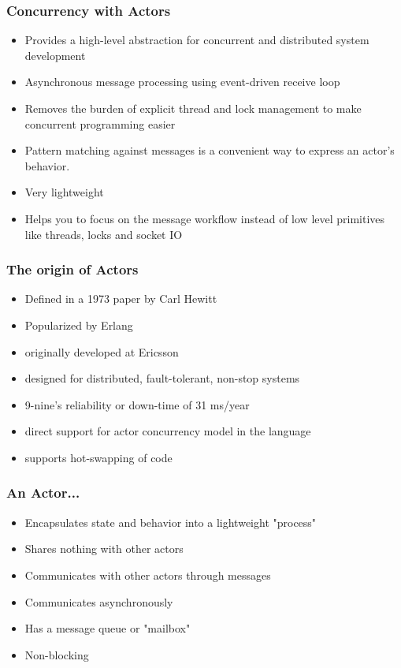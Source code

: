 \documentclass{beamer}
\begin{document}
\frame
    {
      \frametitle{Concurrency with Actors}
      \begin{itemize}
      \item Provides a high-level abstraction for concurrent and distributed
        system development
      \item  Asynchronous message processing using event-driven
        receive loop
      \item Removes the burden of explicit thread and lock management to
        make concurrent programming easier
      \item Pattern matching
        against messages is a convenient way to express an actor's
        behavior.
      \item Very lightweight
      \item Helps you to focus on the message workflow instead of
        low level primitives like threads, locks and socket IO
      \end{itemize}
    }



\frame
    {
      \frametitle{The origin of Actors}
      \begin{itemize}
      \item Defined in a 1973 paper by Carl Hewitt

      \item Popularized by Erlang

      \item originally developed at Ericsson
      \item  designed for distributed, fault-tolerant, non-stop systems
      \item 9-nine's reliability or down-time of 31 ms/year
      \item direct support for actor concurrency model in the language
      \item supports hot-swapping of code
      \end{itemize}
    }




\frame
{
  \frametitle{An Actor...}

  \begin{itemize}
  \item Encapsulates state and behavior into a lightweight "process"
  \item Shares nothing with other actors
  \item Communicates with other actors through messages 
  \item Communicates asynchronously
  \item Has a message queue or "mailbox"
  \item Non-blocking

  \end{itemize}
}
\end{document}
